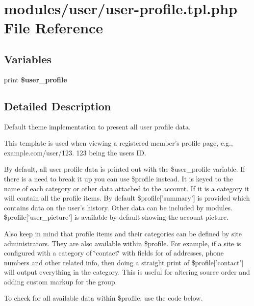 \hypertarget{user-profile_8tpl_8php}{
\section{modules/user/user-profile.tpl.php File Reference}
\label{user-profile_8tpl_8php}
}
\subsection*{Variables}
\begin{CompactItemize}
\item 
\hypertarget{user-profile_8tpl_8php_09ded008fa582f857aa2045c8011d48b}{
print \textbf{\$user\_\-profile}}
\label{user-profile_8tpl_8php_09ded008fa582f857aa2045c8011d48b}

\end{CompactItemize}


\subsection{Detailed Description}
Default theme implementation to present all user profile data.

This template is used when viewing a registered member's profile page, e.g., example.com/user/123. 123 being the users ID.

By default, all user profile data is printed out with the \$user\_\-profile variable. If there is a need to break it up you can use \$profile instead. It is keyed to the name of each category or other data attached to the account. If it is a category it will contain all the profile items. By default \$profile\mbox{[}'summary'\mbox{]} is provided which contains data on the user's history. Other data can be included by modules. \$profile\mbox{[}'user\_\-picture'\mbox{]} is available by default showing the account picture.

Also keep in mind that profile items and their categories can be defined by site administrators. They are also available within \$profile. For example, if a site is configured with a category of \char`\"{}contact\char`\"{} with fields for of addresses, phone numbers and other related info, then doing a straight print of \$profile\mbox{[}'contact'\mbox{]} will output everything in the category. This is useful for altering source order and adding custom markup for the group.

To check for all available data within \$profile, use the code below. 

